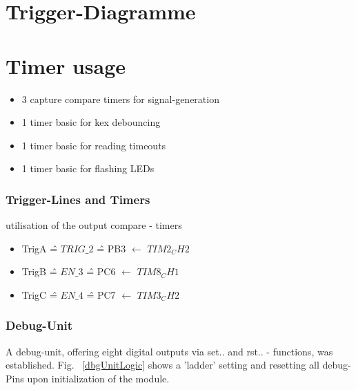 \documentclass[master,english,smartquotes,apa]{hgbthesis}
\begin{document}
		\section{Trigger-Diagramme}
		\section{Timer usage}
			\begin{itemize} \setlength\itemsep{1px}
			\item 3 capture compare timers for signal-generation
			\item 1 timer basic for kex debouncing 
			\item 1 timer basic for reading timeouts
			\item 1 timer basic for flashing LEDs
			\end{itemize}
		\subsubsection{Trigger-Lines and Timers}
		utilisation of the output compare - timers
		\begin{itemize}
			\item TrigA \^{=} $TRIG\_2$  \^{=} PB3 $\leftarrow$ $TIM2_CH2$
			\item TrigB \^{=} $EN\_3$    \^{=} PC6 $\leftarrow$ $TIM8_CH1$
			\item TrigC \^{=} $EN\_4$    \^{=} PC7 $\leftarrow$ $TIM3_CH2$
		\end{itemize}
		\subsubsection{Debug-Unit}
		A debug-unit, offering eight digital outputs via set.. and rst.. - functions, was established. Fig. ~\ref{dbgUnitLogic} shows a 'ladder' setting and resetting all debug-Pins upon initialization of the module.
		

		
		
\end{document}
